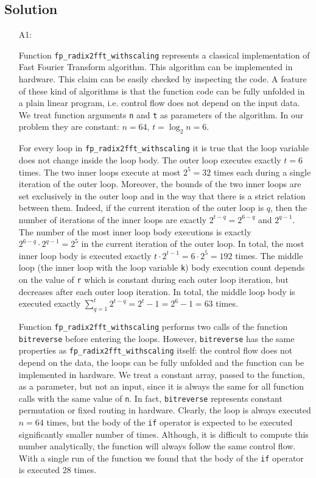 \documentclass[12pt,a4paper,titlepage,oneside]{article}
\begin{document}
\subsection{Solution}
\begin{itemize}
\item[A1:] 

Function \texttt{fp\_radix2fft\_withscaling} represents a classical implementation of Fast Fourier Transform algorithm.
This algorithm can be implemented in hardware.
This claim can be easily checked by inspecting the code.
A feature of these kind of algorithms is that the function code can be fully unfolded in a plain linear program, i.e. control flow does not depend on the input data.
We treat function arguments \texttt{n} and \texttt{t} as parameters of the algorithm.
In our problem they are constant: $n=64$, $t=\log_2 n = 6$.

For every loop in \texttt{fp\_radix2fft\_withscaling} it is true that the loop variable does not change inside the loop body.
The outer loop executes exactly $t=6$ times.
The two inner loops execute at most $2^5=32$ times each during a single iteration of the outer loop.
Moreover, the bounds of the two inner loops are set exclusively in the outer loop and in the way that there is a strict relation between them.
Indeed, if the current iteration of the outer loop is $q$, then the number of iterations of the inner loops are exactly $2^{t-q}=2^{6-q}$ and $2^{q-1}$.
The number of the most inner loop body executions is exactly $2^{6-q}\cdot2^{q-1}=2^5$ in the current iteration of the outer loop.
In total, the most inner loop body is executed exactly $t\cdot2^{t-1}=6\cdot2^5=192$ times.
The middle loop (the inner loop with the loop variable \texttt{k}) body execution count depends on the value of \texttt{r} which is constant during each outer loop iteration, but decreases after each outer loop iteration.
In total, the middle loop body is executed exactly $\sum_{q=1}^t 2^{t-q} = 2^t -1 = 2^6-1 = 63$ times.

Function \texttt{fp\_radix2fft\_withscaling} performs two calls of the function \texttt{bitreverse} before entering the loops.
However, \texttt{bitreverse} has the same properties as \texttt{fp\_radix2fft\_withscaling} itself: the control flow does not depend on the data, the loops can be fully unfolded and the function can be implemented in hardware.
We treat a constant array, passed to the function, as a parameter, but not an input, since it is always the same for all function calls with the same value of \texttt{n}.
In fact, \texttt{bitreverse} represents constant permutation or fixed routing in hardware.
Clearly, the loop is always executed $n=64$ times, but the body of the \texttt{if} operator is expected to be executed significantly smaller number of times.
Although, it is difficult to compute this number analytically, the function will always follow the same control flow.
With a single run of the function we found that the body of the \texttt{if} operator is executed 28 times.


\end{itemize}
\end{document}
